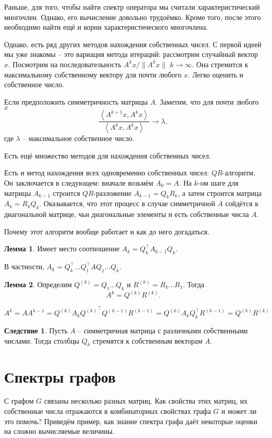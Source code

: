 \documentclass[10pt,a4paper,oneside]{book}
\theoremstyle{definition}
\newtheorem{lem}{\color{green!50!black}Лемма}
\newtheorem{cor}{\color{green!45!black}Следствие}
\def\lan{\left\langle }
\def\ran{\right\rangle}
\def\lm{\begin{lem}}
\def\elm{\end{lem}}
\def\crl{\begin{cor}}
\def\ecrl{\end{cor}}
\begin{document}
Раньше, для того, чтобы найти спектр оператора мы считали характеристический многочлен. Однако, его вычисление довольно трудоёмко. Кроме того, после этого необходимо найти ещё и корни характеристического многочлена.


Однако, есть ряд других методов нахождения собственных чисел. С первой идеей мы уже знакомы -- это вариация метода итераций: рассмотрим случайный вектор $x$. Посмотрим на последовательность $A^kx/\|A^kx\|$ $k\to \infty$. Она стремится к максимальному собственному вектору для почти любого $x$. Легко оценить и собственное число.

Если предположить симметричность матрицы $A$. Заметим, что  для почти любого $x$ 
$$\frac {\lan A^{k+1}x, A^k x \ran}{\lan A^k x, A^k x \ran} \to \lambda, $$
где $\lambda$ -- максимальное собственное число.

Есть ещё множество методов для нахождения собственных чисел. 

Есть и метод нахождения всех одновременно собственных чисел: $QR$-алгоритм. Он заключается в следующем: вначале возьмём $A_0=A$. На $k$-ом шаге для матрицы $A_{k-1}$ строится $QR$-разложение $A_{k-1}=Q_kR_k$, а затем строится матрица $A_k=R_kQ_k$. Оказывается, что этот процесс в случае симметричной $A$ сойдётся к диагональной матрице, чьи диагональные элементы  и есть собственные числа $A$. 

Почему этот алгоритм вообще работает и как до него догадаться.

\lm Имеет место соотношение $A_k=Q_k^\top A_{k-1} Q_k$.
\elm

В частности, $A_k=Q_k^\top \dots Q_1^\top A Q_1 \dots Q_k$.

\lm Определим $Q^{(k)}=Q_1\dots Q_k$ и $R^{(k)}= R_k \dots R_1$. Тогда 
$$A^k=Q^{(k)}R^{(k)}.$$
\elm
\proof $$A^k=A A^{k-1}= Q^{(k)}A_k{Q^{(k)}}^\top Q^{(k-1)}R^{(k-1)} = Q^{(k)}A_k Q_k^\top R^{(k-1)}=Q^{(k)} R^{(k)}$$
\endproof

\crl Пусть $A$ -- симметричная матрица с различными собственными числами. Тогда столбцы $Q_k$ стремятся к собственным векторам $A$.
\ecrl
\proof
\endproof



\section{Спектры графов}
С графом $G$ связаны несколько разных матриц. Как свойства этих матриц, их собственные числа отражаются в комбинаторных свойствах графа $G$ и может ли это помочь?
Приведём пример, как знание спектра графа даёт некоторые оценки на сложно вычисляемые величины.
\end{document}
